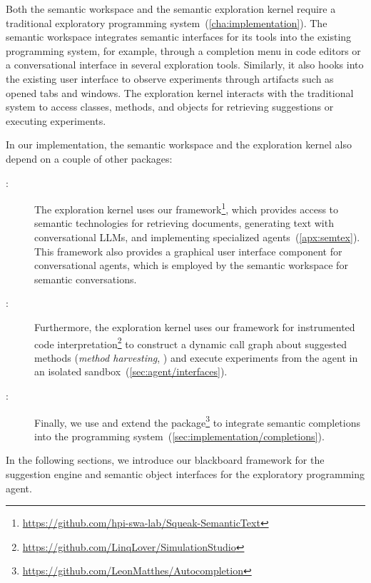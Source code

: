 Both the semantic workspace and the semantic exploration kernel require a traditional exploratory programming system~(\cref{cha:implementation}).
The semantic workspace integrates semantic interfaces for its tools into the existing programming system, for example, through a completion menu in code editors or a conversational interface in several exploration tools.
Similarly, it also hooks into the existing user interface to observe experiments through artifacts such as opened tabs and windows.
The exploration kernel interacts with the traditional system to access classes, methods, and objects for retrieving suggestions or executing experiments.

In our implementation, the semantic workspace and the exploration kernel also depend on a couple of other packages:

\begin{description}
	\item[\semtex:]
	The exploration kernel uses our \semtex framework\footnote{\url{https://github.com/hpi-swa-lab/Squeak-SemanticText}}, which provides access to semantic technologies for retrieving documents, generating text with conversational LLMs, and implementing specialized agents~(\cref{apx:semtex}).
	This framework also provides a graphical user interface component for conversational agents, which is employed by the semantic workspace for semantic conversations.

	\item[:]
	Furthermore, the exploration kernel uses our  framework for instrumented code interpretation\footnote{\url{https://github.com/LinqLover/SimulationStudio}} to construct a dynamic call graph about suggested methods (\emph{method harvesting}, ) and execute experiments from the agent in an isolated sandbox~(\cref{sec:agent/interfaces}).

	\item[:]
	Finally, we use and extend the  package\footnote{\url{https://github.com/LeonMatthes/Autocompletion}} to integrate semantic completions into the programming system~(\cref{sec:implementation/completions}).
\end{description}

In the following sections, we introduce our blackboard framework for the suggestion engine and semantic object interfaces for the exploratory programming agent.
